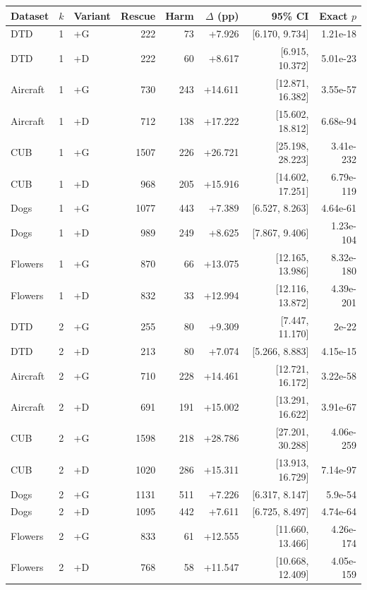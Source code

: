 \begin{tabular}{lllrrrrr}
\toprule
Dataset & $k$ & Variant & Rescue & Harm & $\Delta$ (pp) & 95\% CI & Exact $p$ \\
\midrule
DTD & 1 & +G & 222 & 73 & +7.926 & [6.170, 9.734] & 1.21e-18 \\
DTD & 1 & +D & 222 & 60 & +8.617 & [6.915, 10.372] & 5.01e-23 \\
Aircraft & 1 & +G & 730 & 243 & +14.611 & [12.871, 16.382] & 3.55e-57 \\
Aircraft & 1 & +D & 712 & 138 & +17.222 & [15.602, 18.812] & 6.68e-94 \\
CUB & 1 & +G & 1507 & 226 & +26.721 & [25.198, 28.223] & 3.41e-232 \\
CUB & 1 & +D & 968 & 205 & +15.916 & [14.602, 17.251] & 6.79e-119 \\
Dogs & 1 & +G & 1077 & 443 & +7.389 & [6.527, 8.263] & 4.64e-61 \\
Dogs & 1 & +D & 989 & 249 & +8.625 & [7.867, 9.406] & 1.23e-104 \\
Flowers & 1 & +G & 870 & 66 & +13.075 & [12.165, 13.986] & 8.32e-180 \\
Flowers & 1 & +D & 832 & 33 & +12.994 & [12.116, 13.872] & 4.39e-201 \\
DTD & 2 & +G & 255 & 80 & +9.309 & [7.447, 11.170] & 2e-22 \\
DTD & 2 & +D & 213 & 80 & +7.074 & [5.266, 8.883] & 4.15e-15 \\
Aircraft & 2 & +G & 710 & 228 & +14.461 & [12.721, 16.172] & 3.22e-58 \\
Aircraft & 2 & +D & 691 & 191 & +15.002 & [13.291, 16.622] & 3.91e-67 \\
CUB & 2 & +G & 1598 & 218 & +28.786 & [27.201, 30.288] & 4.06e-259 \\
CUB & 2 & +D & 1020 & 286 & +15.311 & [13.913, 16.729] & 7.14e-97 \\
Dogs & 2 & +G & 1131 & 511 & +7.226 & [6.317, 8.147] & 5.9e-54 \\
Dogs & 2 & +D & 1095 & 442 & +7.611 & [6.725, 8.497] & 4.74e-64 \\
Flowers & 2 & +G & 833 & 61 & +12.555 & [11.660, 13.466] & 4.26e-174 \\
Flowers & 2 & +D & 768 & 58 & +11.547 & [10.668, 12.409] & 4.05e-159 \\
\bottomrule
\end{tabular}
